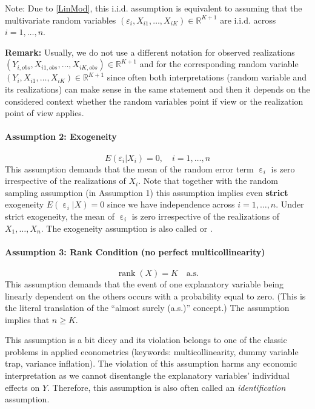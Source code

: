 \documentclass[
  14pt,
]{memoir}
\DeclareMathOperator{\rank}{rank}
\DeclareMathOperator{\eps}{\varepsilon}
\begin{document}
Note: Due to \eqref{LinMod}, this i.i.d. assumption is equivalent to assuming that the multivariate
random variables \((\varepsilon_i,X_{i1},\dots,X_{iK})\in\mathbb{R}^{K+1}\) are i.i.d. across
\(i=1,\dots,n\).

\textbf{Remark:} Usually, we do not use a different notation for observed realizations
\((Y_{i,obs},X_{i1,obs},\dots,X_{iK,obs})\in\mathbb{R}^{K+1}\)
and for the corresponding random variable
\((Y_{i},X_{i1},\dots,X_{iK})\in\mathbb{R}^{K+1}\)
since often both interpretations (random variable and its realizations) can make sense
in the same statement and then it depends on the considered context whether the random variables
point if view or the realization point of view applies.

\paragraph*{Assumption 2: Exogeneity}

\[E(\varepsilon_i|X_i)=0,\quad i=1,\dots,n\]
This assumption demands that the mean of the random error term \(\eps_i\) is zero irrespective of the realizations of \(X_i\). Note that together with the random sampling assumption (in Assumption 1) this assumption implies even \textbf{strict} exogeneity \(E(\eps_i|X) = 0\) since we have independence across \(i=1,\dots,n\). Under strict exogeneity, the mean of \(\eps_i\) is zero irrespective of the realizations of \(X_1,\dots,X_n\). The exogeneity assumption is also called  or .

\paragraph*{Assumption 3: Rank Condition (no perfect multicollinearity)}

\[\rank(X)=K\quad\text{a.s.}\]
This assumption demands that the event of one explanatory variable being linearly dependent on the others occurs with a probability equal to zero. (This is the literal translation of the ``almost surely (a.s.)'' concept.) The assumption implies that \(n\geq K\).

This assumption is a bit dicey and its violation belongs to one of the classic problems in applied econometrics (keywords: multicollinearity, dummy variable trap, variance inflation). The violation of this assumption harms any economic interpretation as we cannot disentangle the explanatory variables' individual effects on \(Y\). Therefore, this assumption is also often called an \emph{identification} assumption.
\end{document}
